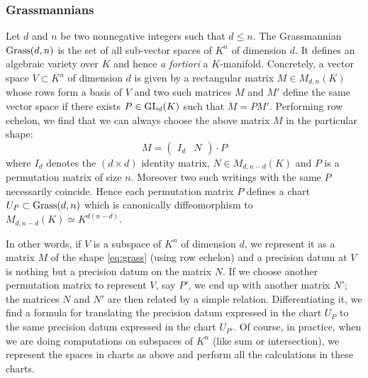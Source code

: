 \documentclass{lms}
\begin{document}
\subsubsection*{Grassmannians}

Let $d$ and $n$ be two nonnegative integers such that $d \leq n$. The 
Grassmannian $\text{\rm Grass}(d,n)$ is the set of all sub-vector spaces of $K^n$ 
of dimension $d$. It defines an algebraic variety over $K$ and hence
\emph{a fortiori} a $K$-manifold.
Concretely, a vector space $V \subset K^n$ of dimension $d$ is given by 
a rectangular matrix $M \in M_{d,n}(K)$ whose rows form a basis of $V$ 
and two such matrices $M$ and $M'$ define the same vector space if there 
exists $P \in \text{\rm GL}_d(K)$ such that $M = P M'$. Performing row echelon, we 
find that we can always choose the above matrix $M$ in the particular
shape:
\begin{equation}
\label{eq:grass}
M = \begin{pmatrix} I_d & N \end{pmatrix} \cdot P
\end{equation}
where $I_d$ denotes the $(d \times d)$ identity matrix, $N \in M_{d, 
n-d}(K)$ and $P$ is a permutation matrix of size $n$. Moreover two 
such writings with the same $P$ necessarily coincide. Hence each 
permutation matrix $P$ defines a chart $U_P \subset \text{\rm Grass}(d,n)$ which
is canonically diffeomorphism to $M_{d, n-d}(K) \simeq K^{d(n-d)}$.

In other words, if $V$ is a subspace of $K^n$ of dimension $d$, we 
represent it as a matrix $M$ of the shape \eqref{eq:grass} (using row 
echelon) and a precision datum at $V$ is nothing but a precision datum on 
the matrix $N$. If we choose another permutation matrix to represent $V$, 
say $P'$, we end up with another matrix $N'$; the matrices $N$ and $N'$ 
are then related by a simple relation. Differentiating it, we find a 
formula for translating the precision datum expressed in the chart $U_P$ 
to the same precision datum expressed in the chart $U_{P'}$.
Of course, in practice, when we are doing computations on subspaces of
$K^n$ (like sum or intersection), we represent the spaces in charts as
above and perform all the calculations in these charts.

%
\end{document}
